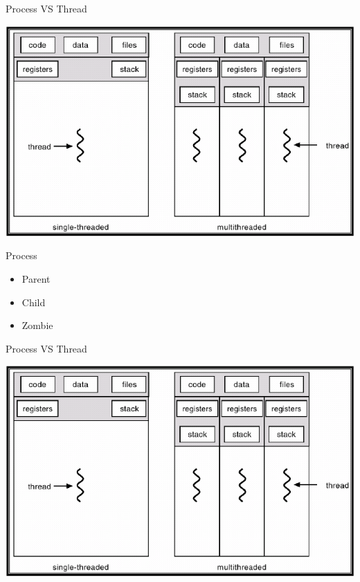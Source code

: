 \begin{frame}{Process VS Thread}
  \begin{center}
    \includegraphics[width=\textwidth,keepaspectratio]{sources/images/threadmodel.png}
  \end{center}
\end{frame}

\begin{frame}{Process}
  \begin{center}
    \begin{itemize}
      \item Parent
      \item Child
      \item Zombie
      \end{itemize}
  \end{center}
\end{frame}

\begin{frame}{Process VS Thread}
  \begin{center}
    \includegraphics[width=\textwidth,keepaspectratio]{sources/images/threadmodel.png}
  \end{center}
\end{frame}

